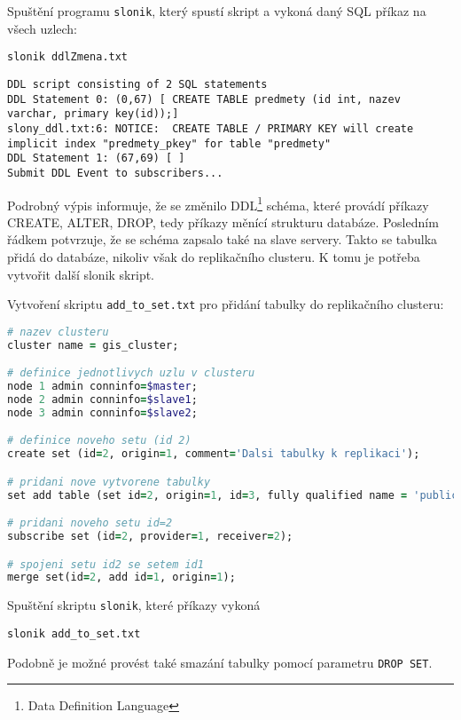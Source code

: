 Spuštění programu \texttt{slonik}, který spustí skript a vykoná daný SQL příkaz na všech uzlech: 

\begin{lstlisting}
slonik ddlZmena.txt
\end{lstlisting}
\begin{lstlisting}[identifierstyle=\color{black},stringstyle=\color{black},keywordstyle=\color{black}]
DDL script consisting of 2 SQL statements
DDL Statement 0: (0,67) [ CREATE TABLE predmety (id int, nazev varchar, primary key(id));]
slony_ddl.txt:6: NOTICE:  CREATE TABLE / PRIMARY KEY will create implicit index "predmety_pkey" for table "predmety"
DDL Statement 1: (67,69) [ ]
Submit DDL Event to subscribers...
\end{lstlisting}

Podrobný výpis informuje, že se změnilo DDL\footnote{Data Definition Language} schéma, které provádí příkazy CREATE, ALTER, DROP, tedy příkazy měnící strukturu databáze. Posledním řádkem potvrzuje, že se schéma zapsalo také na slave servery. Takto se tabulka přidá do databáze, nikoliv však do replikačního clusteru. K tomu je potřeba vytvořit další slonik skript. 

Vytvoření skriptu \texttt{add\_to\_set.txt} pro přidání tabulky do replikačního clusteru:

\begin{lstlisting}[language=ruby]
# nazev clusteru
cluster name = gis_cluster;

# definice jednotlivych uzlu v clusteru
node 1 admin conninfo=$master;
node 2 admin conninfo=$slave1;
node 3 admin conninfo=$slave2;

# definice noveho setu (id 2)
create set (id=2, origin=1, comment='Dalsi tabulky k replikaci');

# pridani nove vytvorene tabulky
set add table (set id=2, origin=1, id=3, fully qualified name = 'public.predmet', comment='seznam predmetu');

# pridani noveho setu id=2
subscribe set (id=2, provider=1, receiver=2);

# spojeni setu id2 se setem id1
merge set(id=2, add id=1, origin=1);
\end{lstlisting}

Spuštění skriptu \texttt{slonik}, které příkazy vykoná

\begin{lstlisting}
slonik add_to_set.txt
\end{lstlisting}

Podobně je možné provést také smazání tabulky pomocí parametru \texttt{DROP SET}. 

